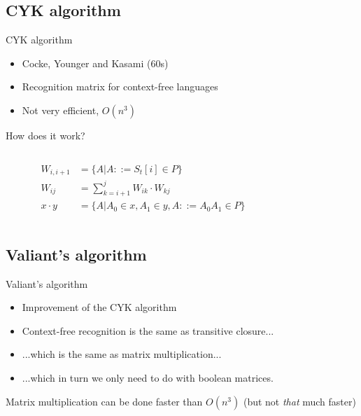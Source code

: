 \documentclass{beamer}
\newcommand{\subt}[3] { 
  \draw[grid] (#1,#1) -- (#1,#2) node[inChart] {#3} -- (#2,#2);
  \fill[color=black] (#1,#2) circle (2pt)
 }
\newcommand{\mrk}[2]{\node[inChart] at (#1,#1) {#2}}
\begin{document}
\subsection{CYK algorithm}
\begin{frame}{CYK algorithm}
    \begin{itemize}
        \item Cocke, Younger and Kasami (60s)
        \item Recognition matrix for context-free languages
        \item Not very efficient, $O(n^3)$
    \end{itemize}
\end{frame}

\begin{frame}{How does it work?}
  \begin{columns}[c]
  \begin{column}{.5\textwidth}

    \begin{align*}
    W_{i,i+1} &= \{ A | A ::= S_t[i] \in P \} \\
    W_{ij}    &= \sum_{k=i+1}^{j} W_{ik} \cdot W_{kj} \\
    x \cdot y &= \{ A | A_0 \in x, A_1 \in y, A ::= A_0A_1 \in P \} \label{abc}
    \end{align*}

  \end{column}

  \begin{column}{.4\textwidth}
  \end{column}
  \end{columns}
\end{frame}

\subsection{Valiant's algorithm}
\begin{frame}{Valiant's algorithm}
    \begin{itemize}
        \item Improvement of the CYK algorithm
        \item Context-free recognition is the same as transitive closure...
        \item ...which is the same as matrix multiplication...
        \item ...which in turn we only need to do with boolean matrices.
    \end{itemize}
    Matrix multiplication can be done faster than $O(n^3)$ (but not
    \textit{that} much faster)
\end{frame}
\end{document}
